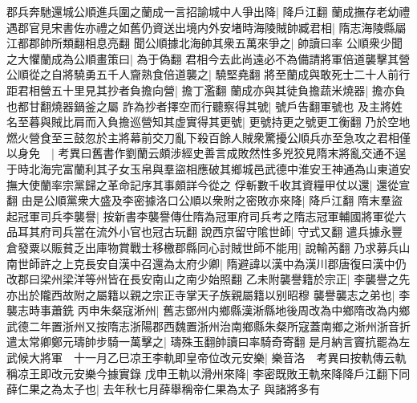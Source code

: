 郡兵奔馳還城公順進兵圍之蘭成一言招諭城中人爭出降|{
	降戶江翻}
蘭成撫存老幼禮遇郡官見宋書佐亦禮之如舊仍資送出境内外安堵時海陵賊帥臧君相|{
	隋志海陵縣屬江都郡帥所類翻相息亮翻}
聞公順據北海帥其衆五萬來爭之|{
	帥讀曰率}
公順衆少聞之大懼蘭成為公順畫策曰|{
	為于偽翻}
君相今去此尚遠必不為備請將軍倍道襲擊其營公順從之自將驍勇五千人齎熟食倍道襲之|{
	驍堅堯翻}
將至蘭成與敢死士二十人前行距君相營五十里見其抄者負擔向營|{
	擔丁濫翻}
蘭成亦與其徒負擔蔬米燒器|{
	擔亦負也都甘翻燒器鍋釜之屬}
詐為抄者擇空而行聽察得其號|{
	號戶告翻軍號也}
及主將姓名至暮與賊比肩而入負擔巡營知其虚實得其更號|{
	更號持更之號更工衡翻}
乃於空地燃火營食至三鼓忽於主將幕前交刀亂下殺百餘人賊衆驚擾公順兵亦至急攻之君相僅以身免　|{
	考異曰舊書作劉蘭云頗涉經史善言成敗然性多兇狡見隋末將亂交通不逞于時北海完富蘭利其子女玉帛與羣盜相應破其鄉城邑武德中淮安王神通為山東道安撫大使蘭率宗黨歸之革命記序其事頗詳今從之}
俘斬數千收其資糧甲仗以還|{
	還從宣翻}
由是公順黨衆大盛及李密據洛口公順以衆附之密敗亦來降|{
	降戶江翻}
隋末羣盜起冠軍司兵李襲譽|{
	按新書李襲譽傳仕隋為冠軍府司兵考之隋志冠軍輔國將軍從六品耳其府司兵當在流外小官也冠古玩翻}
說西京留守隂世師|{
	守式又翻}
遣兵據永豐倉發粟以賑貧乏出庫物賞戰士移檄郡縣同心討賊世師不能用|{
	說輸芮翻}
乃求募兵山南世師許之上克長安自漢中召還為太府少卿|{
	隋避諱以漢中為漢川郡唐復曰漢中仍改郡曰梁州梁洋等州皆在長安南山之南少始照翻}
乙未附襲譽籍於宗正|{
	李襲譽之先亦出於隴西故附之屬籍以親之宗正寺掌天子族親屬籍以别昭穆}
襲譽襲志之弟也|{
	李襲志時事蕭銑}
丙申朱粲寇淅州|{
	舊志鄧州内鄉縣漢淅縣地後周改為中鄉隋改為内鄉武德二年置浙州又按隋志浙陽郡西魏置浙州治南鄉縣朱粲所寇蓋南鄉之淅州浙音折}
遣太常卿鄭元璹帥步騎一萬擊之|{
	璹殊玉翻帥讀曰率騎奇寄翻}
是月納言竇抗罷為左武候大將軍　十一月乙巳凉王李軌即皇帝位改元安樂|{
	樂音洛　考異曰按軌傳云軌稱凉王即改元安樂今據實錄}
戊申王軌以滑州來降|{
	李密既敗王軌來降降戶江翻下同}
薛仁果之為太子也|{
	去年秋七月薛舉稱帝仁果為太子}
與諸將多有

